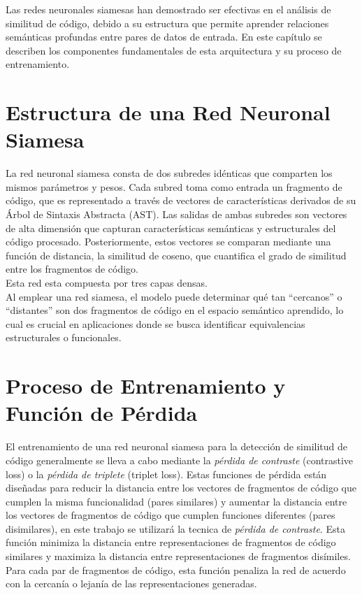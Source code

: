 Las redes neuronales siamesas han demostrado ser efectivas en el análisis de similitud de código, debido a su estructura que permite aprender relaciones semánticas profundas entre pares de datos de entrada. En este capítulo se describen los componentes fundamentales de esta arquitectura y su proceso de entrenamiento.

\section{Estructura de una Red Neuronal Siamesa}

La red neuronal siamesa consta de dos subredes idénticas que comparten los mismos parámetros y pesos. Cada subred toma como entrada un fragmento de código, que es representado a través de vectores de características derivados de su Árbol de Sintaxis Abstracta (AST). Las salidas de ambas subredes son vectores de alta dimensión que capturan características semánticas y estructurales del código procesado. Posteriormente, estos vectores se comparan mediante una función de distancia, la similitud de coseno, que cuantifica el grado de similitud entre los fragmentos de código.\\

Esta red esta compuesta por tres capas densas.\\

Al emplear una red siamesa, el modelo puede determinar qué tan “cercanos” o “distantes” son dos fragmentos de código en el espacio semántico aprendido, lo cual es crucial en aplicaciones donde se busca identificar equivalencias estructurales o funcionales.

\section{Proceso de Entrenamiento y Función de Pérdida}

El entrenamiento de una red neuronal siamesa para la detección de similitud de código generalmente se lleva a cabo mediante la \textit{pérdida de contraste} (contrastive loss) o la \textit{pérdida de triplete} (triplet loss). Estas funciones de pérdida están diseñadas para reducir la distancia entre los vectores de fragmentos de código que cumplen la misma funcionalidad (pares similares) y aumentar la distancia entre los vectores de fragmentos de código que cumplen funciones diferentes (pares disimilares), en este trabajo se utilizará la tecnica de \textit{pérdida de contraste}. Esta función minimiza la distancia entre representaciones de fragmentos de código similares y maximiza la distancia entre representaciones de fragmentos disímiles. Para cada par de fragmentos de código, esta función penaliza la red de acuerdo con la cercanía o lejanía de las representaciones generadas.


